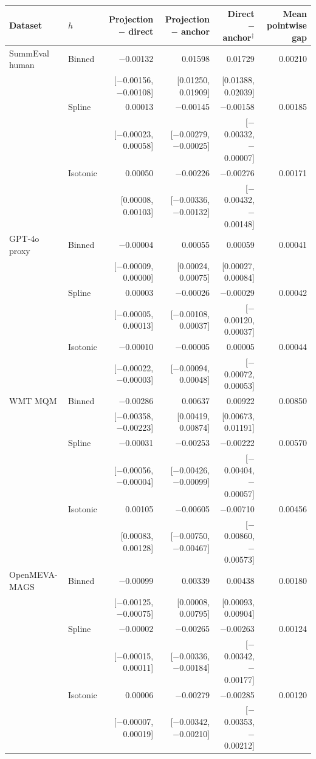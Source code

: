 \begin{tabular}{llrrrr}
\toprule
Dataset & $h$ & Projection $-$ direct & Projection $-$ anchor & Direct $-$ anchor$^{\dagger}$ & Mean pointwise gap \\
\midrule
SummEval human & Binned & $-$0.00132 & 0.01598 & 0.01729 & 0.00210 \\
 &  & [$-$0.00156, $-$0.00108] & [0.01250, 0.01909] & [0.01388, 0.02039] &  \\
 & Spline & 0.00013 & $-$0.00145 & $-$0.00158 & 0.00185 \\
 &  & [$-$0.00023, 0.00058] & [$-$0.00279, $-$0.00025] & [$-$0.00332, $-$0.00007] &  \\
 & Isotonic & 0.00050 & $-$0.00226 & $-$0.00276 & 0.00171 \\
 &  & [0.00008, 0.00103] & [$-$0.00336, $-$0.00132] & [$-$0.00432, $-$0.00148] &  \\
\midrule
GPT-4o proxy & Binned & $-$0.00004 & 0.00055 & 0.00059 & 0.00041 \\
 &  & [$-$0.00009, 0.00000] & [0.00024, 0.00075] & [0.00027, 0.00084] &  \\
 & Spline & 0.00003 & $-$0.00026 & $-$0.00029 & 0.00042 \\
 &  & [$-$0.00005, 0.00013] & [$-$0.00108, 0.00037] & [$-$0.00120, 0.00037] &  \\
 & Isotonic & $-$0.00010 & $-$0.00005 & 0.00005 & 0.00044 \\
 &  & [$-$0.00022, $-$0.00003] & [$-$0.00094, 0.00048] & [$-$0.00072, 0.00053] &  \\
\midrule
WMT MQM & Binned & $-$0.00286 & 0.00637 & 0.00922 & 0.00850 \\
 &  & [$-$0.00358, $-$0.00223] & [0.00419, 0.00874] & [0.00673, 0.01191] &  \\
 & Spline & $-$0.00031 & $-$0.00253 & $-$0.00222 & 0.00570 \\
 &  & [$-$0.00056, $-$0.00004] & [$-$0.00426, $-$0.00099] & [$-$0.00404, $-$0.00057] &  \\
 & Isotonic & 0.00105 & $-$0.00605 & $-$0.00710 & 0.00456 \\
 &  & [0.00083, 0.00128] & [$-$0.00750, $-$0.00467] & [$-$0.00860, $-$0.00573] &  \\
\midrule
OpenMEVA-MAGS & Binned & $-$0.00099 & 0.00339 & 0.00438 & 0.00180 \\
 &  & [$-$0.00125, $-$0.00075] & [0.00008, 0.00795] & [0.00093, 0.00904] &  \\
 & Spline & $-$0.00002 & $-$0.00265 & $-$0.00263 & 0.00124 \\
 &  & [$-$0.00015, 0.00011] & [$-$0.00336, $-$0.00184] & [$-$0.00342, $-$0.00177] &  \\
 & Isotonic & 0.00006 & $-$0.00279 & $-$0.00285 & 0.00120 \\
 &  & [$-$0.00007, 0.00019] & [$-$0.00342, $-$0.00210] & [$-$0.00353, $-$0.00212] &  \\
\bottomrule
\end{tabular}
